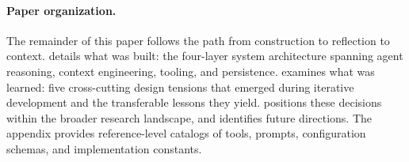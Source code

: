 \paragraph{Paper organization.} The remainder of this paper follows the path from construction to reflection to context.  details what was built: the four-layer system architecture spanning agent reasoning, context engineering, tooling, and persistence.  examines what was learned: five cross-cutting design tensions that emerged during iterative development and the transferable lessons they yield.  positions these decisions within the broader research landscape, and  identifies future directions. The appendix provides reference-level catalogs of tools, prompts, configuration schemas, and implementation constants.
